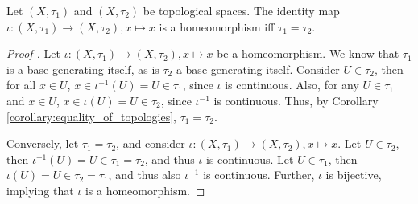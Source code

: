 \begin{theorem}\label{thrm:identity_homeomorphism_topologies_coincide}
	Let $(X, \tau_1)$ and $(X, \tau_2)$ be topological spaces. The identity map $\iota: (X, \tau_1)\to (X, \tau_2), x\mapsto x$ is a homeomorphism iff $\tau_1 = \tau_2$.
\end{theorem}

\begin{proof}[Proof \cite{3164142}]
	Let $\iota: (X, \tau_1)\to (X, \tau_2), x\mapsto x$ be a homeomorphism. We know that $\tau_1$ is a base generating itself, as is $\tau_2$ a base generating itself. Consider $U\in \tau_2$, then for all $x\in U$, $x\in \iota^{-1}(U) = U\in \tau_1$, since $\iota$ is continuous. Also, for any $U\in \tau_1$ and $x\in U$, $x\in \iota(U) = U\in \tau_2$, since $\iota^{-1}$ is continuous. Thus, by Corollary \ref{corollary:equality_of_topologies}, $\tau_1 = \tau_2$.
	
	Conversely, let $\tau_1 = \tau_2$, and consider $\iota: (X, \tau_1)\to (X, \tau_2), x\mapsto x$. Let $U\in \tau_2$, then $\iota^{-1}(U) = U\in \tau_1 = \tau_2$, and thus $\iota$ is continuous. Let $U\in\tau_1$, then $\iota(U) = U\in \tau_2 = \tau_1$, and thus also $\iota^{-1}$ is continuous. Further, $\iota$ is bijective, implying that $\iota$ is a homeomorphism.
\end{proof}